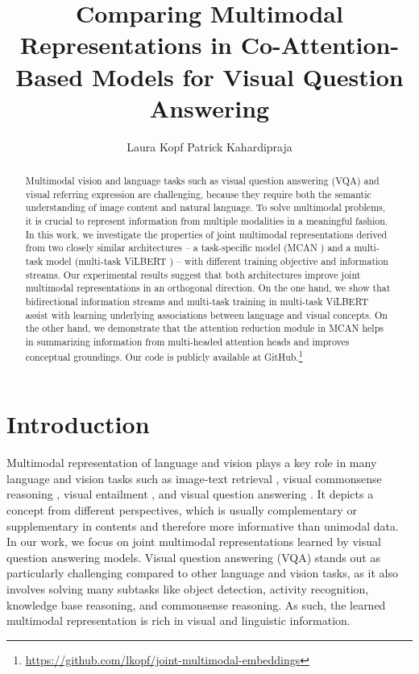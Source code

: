 \documentclass{article}
\title{Comparing Multimodal Representations in Co-Attention-Based Models for Visual Question Answering}
\author{%
   Laura Kopf%
  \And
   Patrick Kahardipraja \\
}
\begin{document}
\maketitle

\begin{abstract}
Multimodal vision and language tasks such as visual question answering (VQA) and visual referring expression are challenging, because they require both the semantic understanding of image content and natural language. To solve multimodal problems, it is crucial to represent information from multiple modalities in a meaningful fashion. In this work, we investigate the properties of joint multimodal representations derived from two closely similar architectures -- a task-specific model (MCAN \citep{yu2019mcan}) and a multi-task model (multi-task ViLBERT \citep{lu2020multitask}) -- with different training objective and information streams. Our experimental results suggest that both architectures improve joint multimodal representations in an orthogonal direction. On the one hand, we show that bidirectional information streams and multi-task training in multi-task ViLBERT assist with learning underlying associations between language and visual concepts. On the other hand, we demonstrate that the attention reduction module in MCAN helps in summarizing information from multi-headed attention heads and improves conceptual groundings. Our code is publicly available at GitHub.\footnote{\url{https://github.com/lkopf/joint-multimodal-embeddings}}
\end{abstract}

\section{Introduction}
Multimodal representation of language and vision plays a key role in many language and vision tasks such as image-text retrieval \citep{wang2016retrieval}, visual commonsense reasoning \citep{zellers2019vcr}, visual entailment \citep{xie2019entailment}, and visual question answering \citep{antol2015vqa}. It depicts a concept from different perspectives, which is usually complementary or supplementary in contents and therefore more informative than unimodal data. In our work, we focus on joint multimodal representations learned by visual question answering models. Visual question answering (VQA) stands out as particularly challenging compared to other language and vision tasks, as it also involves solving many subtasks like object detection, activity recognition, knowledge base reasoning, and commonsense reasoning. As such, the learned multimodal representation is rich in visual and linguistic information. 
\end{document}
